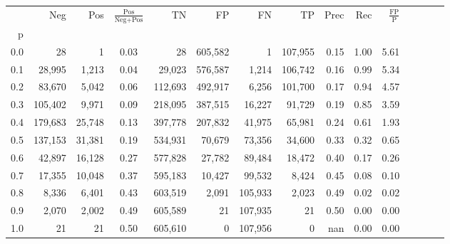 \begin{tabular}{rrrcrrrrrrrrrrr}
\toprule
{} &      Neg &     Pos & $\frac{\text{Pos}}{\text{Neg}+\text{Pos}}$ &       TN &       FP &       FN &       TP &  Prec &   Rec & $\frac{\text{FP}}{\text{P}}$ \\
p   &          &         &                                            &          &          &          &          &       &       &                              \\
\midrule
0.0 &       28 &       1 &                                       0.03 &       28 &  605,582 &        1 &  107,955 &  0.15 &  1.00 &                         5.61 \\
0.1 &   28,995 &   1,213 &                                       0.04 &   29,023 &  576,587 &    1,214 &  106,742 &  0.16 &  0.99 &                         5.34 \\
0.2 &   83,670 &   5,042 &                                       0.06 &  112,693 &  492,917 &    6,256 &  101,700 &  0.17 &  0.94 &                         4.57 \\
0.3 &  105,402 &   9,971 &                                       0.09 &  218,095 &  387,515 &   16,227 &   91,729 &  0.19 &  0.85 &                         3.59 \\
0.4 &  179,683 &  25,748 &                                       0.13 &  397,778 &  207,832 &   41,975 &   65,981 &  0.24 &  0.61 &                         1.93 \\
0.5 &  137,153 &  31,381 &                                       0.19 &  534,931 &   70,679 &   73,356 &   34,600 &  0.33 &  0.32 &                         0.65 \\
0.6 &   42,897 &  16,128 &                                       0.27 &  577,828 &   27,782 &   89,484 &   18,472 &  0.40 &  0.17 &                         0.26 \\
0.7 &   17,355 &  10,048 &                                       0.37 &  595,183 &   10,427 &   99,532 &    8,424 &  0.45 &  0.08 &                         0.10 \\
0.8 &    8,336 &   6,401 &                                       0.43 &  603,519 &    2,091 &  105,933 &    2,023 &  0.49 &  0.02 &                         0.02 \\
0.9 &    2,070 &   2,002 &                                       0.49 &  605,589 &       21 &  107,935 &       21 &  0.50 &  0.00 &                         0.00 \\
1.0 &       21 &      21 &                                       0.50 &  605,610 &        0 &  107,956 &        0 &   nan &  0.00 &                         0.00 \\
\bottomrule
\end{tabular}
